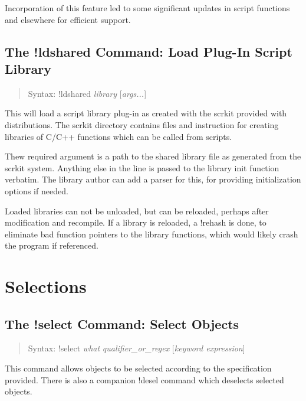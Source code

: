 Incorporation of this feature led to some significant updates in
script functions and elsewhere for efficient support.

\subsection{The {\cb !ldshared} Command: Load Plug-In Script Library}
\begin{quote}
Syntax: {\vt !ldshared} {\it library\/} [{\it args...\/}]
\end{quote}
This will load a script library plug-in as created with the {\vt
scrkit} provided with {\Xic} distributions.  The {\vt scrkit}
directory contains files and instruction for creating libraries of
C/C++ functions which can be called from scripts.

Thew required argument is a path to the shared library file as
generated from the {\vt scrkit} system.  Anything else in the line is
passed to the library {\vt init} function verbatim.  The library
author can add a parser for this, for providing initialization options
if needed.

Loaded libraries can not be unloaded, but can be reloaded, perhaps
after modification and recompile.  If a library is reloaded, a {\cb
!rehash} is done, to eliminate bad function pointers to the library
functions, which would likely crash the program if referenced.

\section{Selections}

\subsection{The {\cb !select} Command: Select Objects}
\begin{quote}
Syntax: {\vt !select} {\it what\/} {\it qualifier\_or\_regex}
 [{\it keyword expression}\/]
\end{quote}
This command allows objects to be selected according to the
specification provided.  There is also a companion {\cb !desel}
command which deselects selected objects.

